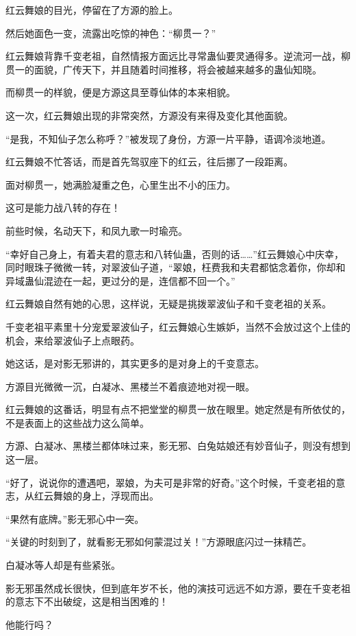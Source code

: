 \begin{this_body}
红云舞娘的目光，停留在了方源的脸上。

然后她面色一变，流露出吃惊的神色：“柳贯一？”

红云舞娘背靠千变老祖，自然情报方面远比寻常蛊仙要灵通得多。逆流河一战，柳贯一的面貌，广传天下，并且随着时间推移，将会被越来越多的蛊仙知晓。

而柳贯一的样貌，便是方源这具至尊仙体的本来相貌。

这一次，红云舞娘出现的非常突然，方源没有来得及变化其他面貌。

“是我，不知仙子怎么称呼？”被发现了身份，方源一片平静，语调冷淡地道。

红云舞娘不忙答话，而是首先驾驭座下的红云，往后挪了一段距离。

面对柳贯一，她满脸凝重之色，心里生出不小的压力。

这可是能力战八转的存在！

前些时候，名动天下，和凤九歌一时瑜亮。

“幸好自己身上，有着夫君的意志和八转仙蛊，否则的话……”红云舞娘心中庆幸，同时眼珠子微微一转，对翠波仙子道，“翠娘，枉费我和夫君都惦念着你，你却和异域蛊仙混迹在一起，更过分的是，连信都不回一个。”

红云舞娘自然有她的心思，这样说，无疑是挑拨翠波仙子和千变老祖的关系。

千变老祖平素里十分宠爱翠波仙子，红云舞娘心生嫉妒，当然不会放过这个上佳的机会，来给翠波仙子上点眼药。

她这话，是对影无邪讲的，其实更多的是对身上的千变意志。

方源目光微微一沉，白凝冰、黑楼兰不着痕迹地对视一眼。

红云舞娘的这番话，明显有点不把堂堂的柳贯一放在眼里。她定然是有所依仗的，不是表面上的这些战力这么简单。

方源、白凝冰、黑楼兰都体味过来，影无邪、白兔姑娘还有妙音仙子，则没有想到这一层。

“好了，说说你的遭遇吧，翠娘，为夫可是非常的好奇。”这个时候，千变老祖的意志，从红云舞娘的身上，浮现而出。

“果然有底牌。”影无邪心中一突。

“关键的时刻到了，就看影无邪如何蒙混过关！”方源眼底闪过一抹精芒。

白凝冰等人却是有些紧张。

影无邪虽然成长很快，但到底年岁不长，他的演技可远远不如方源，要在千变老祖的意志下不出破绽，这是相当困难的！

他能行吗？

\end{this_body}

